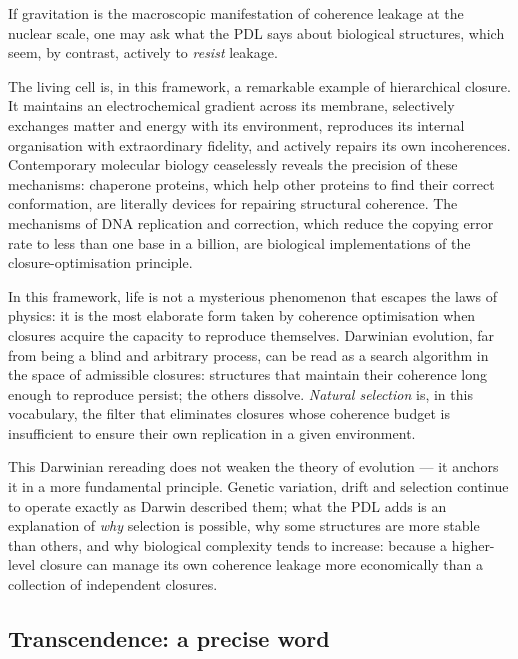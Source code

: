 \documentclass[12pt, a4paper, openright]{book}
\begin{document}
If gravitation is the macroscopic manifestation of coherence leakage at the nuclear scale, one may ask what the PDL says about biological structures, which seem, by contrast, actively to \emph{resist} leakage.

\medskip

The living cell is, in this framework, a remarkable example of hierarchical closure. It maintains an electrochemical gradient across its membrane, selectively exchanges matter and energy with its environment, reproduces its internal organisation with extraordinary fidelity, and actively repairs its own incoherences. Contemporary molecular biology ceaselessly reveals the precision of these mechanisms: chaperone proteins, which help other proteins to find their correct conformation, are literally devices for repairing structural coherence. The mechanisms of DNA replication and correction, which reduce the copying error rate to less than one base in a billion, are biological implementations of the closure-optimisation principle.

\medskip

In this framework, life is not a mysterious phenomenon that escapes the laws of physics: it is the most elaborate form taken by coherence optimisation when closures acquire the capacity to reproduce themselves. Darwinian evolution, far from being a blind and arbitrary process, can be read as a search algorithm in the space of admissible closures: structures that maintain their coherence long enough to reproduce persist; the others dissolve. \emph{Natural selection} is, in this vocabulary, the filter that eliminates closures whose coherence budget is insufficient to ensure their own replication in a given environment.

\medskip

This Darwinian rereading does not weaken the theory of evolution — it anchors it in a more fundamental principle. Genetic variation, drift and selection continue to operate exactly as Darwin described them; what the PDL adds is an explanation of \emph{why} selection is possible, why some structures are more stable than others, and why biological complexity tends to increase: because a higher-level closure can manage its own coherence leakage more economically than a collection of independent closures.

\subsection*{Transcendence: a precise word}
\end{document}
